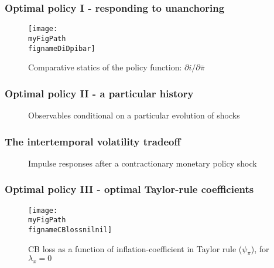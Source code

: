 \documentclass[10pt]{beamer}
\def \myFigPath {../../../figures/}
\def\mySmallFigScale{0.25}
\def\myTinyFigScale{0.16}
\def\fignameDiDpibar{analyze_opt_policy_ip23_Aug_2020}
\def\fignamePEAobsTR{implement_anchTC_obs_TR_approx23_Aug_2020}
\def\fignamePEAobsAnch{implement_anchTC_obs_approx23_Aug_2020_15_09_34}
\def\fignameCBlossnilnil{plot_sim_loss_approx_pretty_losses_again_critsmooth_constant_only_pi_only_lamx0_lami0_2020_08_25}
\def\fignameIRFanchored{command_IFS_anchoring_pretty_RIR_LH_anch_monpol_again_critCUSUM_constant_only_T_400_N_1000_burnin_5_params_psi_pi_1_5_psi_x_0_gbar_0_145_thetbar_16_thettilde_2_5_kap_0_8_lamx_0_lami_0_date_2020_06_05}
\def\fignameIRFunanchored{command_IFS_anchoring_pretty_RIR_LH_unanch_monpol_again_critCUSUM_constant_only_T_400_N_1000_burnin_5_params_psi_pi_1_5_psi_x_0_gbar_0_145_thetbar_16_thettilde_2_5_kap_0_8_lamx_0_lami_0_date_2020_06_05}
\begin{document}

\begin{frame}
	\frametitle{Optimal policy I - responding to unanchoring }
	
\begin{figure}[h!]
\texttt{[image: \\myFigPath \\fignameDiDpibar]}
\caption{Comparative statics of the policy function: $\partial i / \partial \bar{\pi}$}
\end{figure} %

\end{frame}

\begin{frame}
	\frametitle{Optimal policy II - a particular history }
	
\begin{figure}[h!]
{}
\hfill
{}
\caption{Observables conditional on a particular evolution of shocks} 
\end{figure}

\end{frame}

\begin{frame}
	\frametitle{The intertemporal volatility tradeoff}

\begin{figure}[h!]
\caption{Impulse responses after a contractionary monetary policy shock}
\label{IRF}
\end{figure}	

\end{frame}



\begin{frame}
	\frametitle{Optimal policy III - optimal Taylor-rule coefficients}
	
\begin{figure}[h!]
\texttt{[image: \\myFigPath \\fignameCBlossnilnil]}
\caption{CB loss as a function of inflation-coefficient in Taylor rule ($\psi_{\pi}$), for $\lambda_x = 0$}
\end{figure} 

\end{frame}
\end{document}
